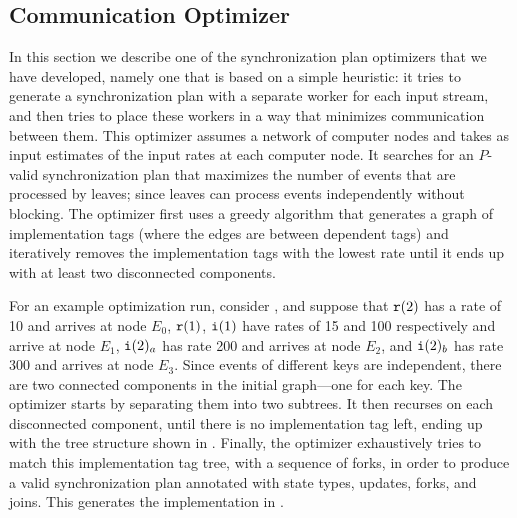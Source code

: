 \subsection{Communication Optimizer}
\label{appendix:optimizer}

In this section we describe one of the synchronization plan optimizers that we have developed, namely one that is based on a simple
heuristic: it tries to generate a synchronization plan with a
separate worker for each input stream, and then tries to place these
workers in a way that minimizes communication between them.
This optimizer assumes a network of computer nodes and takes as input
estimates of the input rates at each computer node. It searches for an
$P$-valid synchronization plan that maximizes the number of events
that are processed by leaves; since leaves can process events
independently without blocking. The optimizer first uses a greedy
algorithm that generates a graph of implementation tags (where the
edges are between dependent tags) and iteratively removes the implementation
tags with the lowest rate until it ends up with at least two
disconnected components.

\begin{example}
\label{example:optimization}
For an example optimization run, consider ,
and suppose that $\texttt{r}(2)$ has a rate of 10 and arrives at node $E_0$,
$\texttt{r}(1)$, $\texttt{i}(1)$ have rates of 15 and 100 respectively and arrive at node $E_1$,
$\texttt{i}(2)_a$ has rate 200 and arrives at node $E_2$,
and $\texttt{i}(2)_b$ has rate 300 and arrives at node $E_3$.
Since events of different keys are independent, there are
two connected components in the initial graph---one for each
key. The optimizer starts by separating them into two
subtrees. It then recurses on each disconnected component, until there
is no implementation tag left, ending up with the tree structure shown
in . Finally, the optimizer
exhaustively tries to match this implementation tag tree, with a
sequence of forks, in order to produce a valid synchronization plan
annotated with state types, updates, forks, and joins.
This generates the implementation in .
\end{example}

